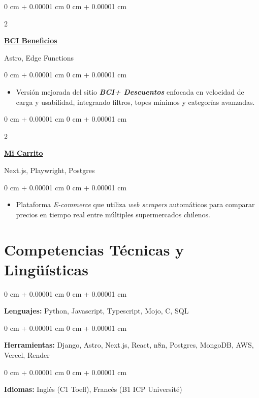 \documentclass[10pt, letterpaper]{article}
\newenvironment{highlights}{
    \begin{itemize}[
        topsep=0.10 cm,
        parsep=0.10 cm,
        partopsep=0pt,
        itemsep=0pt,
        leftmargin=0 cm + 10pt
    ]
}{
    \end{itemize}
} %
\newenvironment{onecolentry}{
    \begin{adjustwidth}{
        0 cm + 0.00001 cm
    }{
        0 cm + 0.00001 cm
    }
}{
    \end{adjustwidth}
} %
\newenvironment{twocolentry}[2][]{
    \onecolentry
    \def\secondColumn{#2}
    \setcolumnwidth{\fill, 4.5 cm}
    \begin{paracol}{2}
}{
    \switchcolumn \raggedleft \secondColumn
    \end{paracol}
    \endonecolentry
} %
\let\hrefWithoutArrow\href
\begin{document}
    \begin{twocolentry}{Astro, Edge Functions}
        \textbf{\href{https://bcibeneficios.onrender.com/}{BCI Beneficios}}
    \end{twocolentry}
    \vspace{0.10 cm}
    \begin{onecolentry}
        \begin{highlights}
            \item Versión mejorada del sitio \textbf{\textit{BCI+ Descuentos} }enfocada en velocidad de carga y usabilidad, integrando filtros, topes mínimos y categorías avanzadas.
        \end{highlights}
    \end{onecolentry}
    \vspace{0.2 cm}


    \begin{twocolentry}{Next.js, Playwright, Postgres}
        \textbf{\hrefWithoutArrow{https://micarritochile.vercel.app/}{Mi Carrito}}
    \end{twocolentry}
    \vspace{0.10 cm}
    \begin{onecolentry}
        \begin{highlights}
            \item Plataforma \textit{E-commerce} que utiliza \textit{web scrapers} automáticos para comparar precios en tiempo real entre múltiples supermercados chilenos.
        \end{highlights}
    \end{onecolentry}


    \section{Competencias Técnicas y Lingüísticas}

    \begin{onecolentry}
        \textbf{Lenguajes:} Python, Javascript, Typescript, Mojo, C, SQL
    \end{onecolentry}
    \vspace{0.1 cm}
    \begin{onecolentry}
        \textbf{Herramientas:} Django, Astro, Next.js, React, n8n, Postgres, MongoDB, AWS, Vercel, Render
    \end{onecolentry}
    \vspace{0.1 cm}
    \begin{onecolentry}
        \textbf{Idiomas:} Inglés (C1 Toefl), Francés (B1 ICP Université)
    \end{onecolentry}
\end{document}
